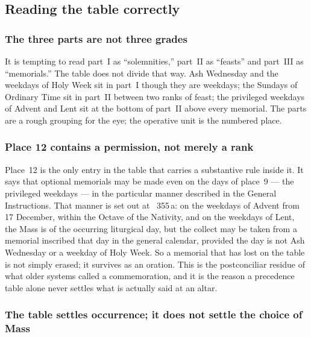 \subsection{Reading the table correctly}

\subsubsection{The three parts are not three grades}

It is tempting to read part~I as ``solemnities,'' part~II as ``feasts'' and part~III as
``memorials.'' The table does not divide that way. Ash Wednesday and the weekdays of Holy Week sit
in part~I though they are weekdays; the Sundays of Ordinary Time sit in part~II between two ranks of
feast; the privileged weekdays of Advent and Lent sit at the bottom of part~II above every memorial.
The parts are a rough grouping for the eye; the operative unit is the numbered place.

\subsubsection{Place 12 contains a permission, not merely a rank}

Place~12 is the only entry in the table that carries a substantive rule inside it. It says that
optional memorials may be made even on the days of place~9 --- the privileged weekdays --- in the
particular manner described in the General Instructions. That manner is set out at ~355\,a:
on the weekdays of Advent from 17 December, within the Octave of the Nativity, and on the weekdays
of Lent, the Mass is of the occurring liturgical day, but the collect may be taken from a memorial
inscribed that day in the general calendar, provided the day is not Ash Wednesday or a weekday of
Holy Week. So a memorial that has lost on the table is not simply erased; it survives as an oration.
This is the postconciliar residue of what older systems called a commemoration, and it is the reason
a precedence table alone never settles what is actually said at an altar.

\subsubsection{The table settles occurrence; it does not settle the choice of Mass}

